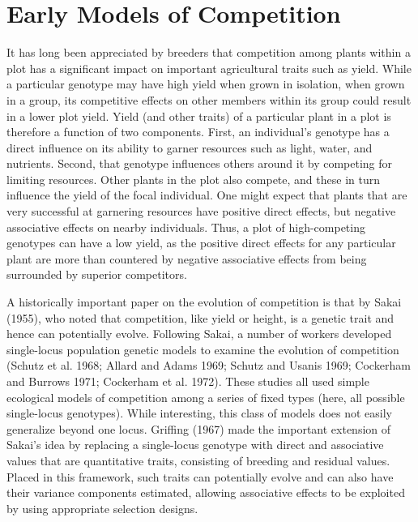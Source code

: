 \documentclass{article}
\begin{document}
\section{Early Models of Competition}
It has long been appreciated by breeders that competition among plants within a plot has a significant impact on important agricultural traits such as yield. While a particular genotype may have high yield when grown in isolation, when grown in a group, its competitive effects on other members within its group could result in a lower plot yield. Yield (and other traits) of a particular plant in a plot is therefore a function of two components. First, an individual's genotype has a direct influence on its ability to garner resources such as light, water, and nutrients. Second, that genotype influences others around it by competing for limiting resources. Other plants in the plot also compete, and these in turn influence the yield of the focal individual. One might expect that plants that are very successful at garnering resources have positive direct effects, but negative associative effects on nearby individuals. Thus, a plot of high-competing genotypes can have a low yield, as the positive direct effects for any particular plant are more than countered by negative associative effects from being surrounded by superior competitors.

A historically important paper on the evolution of competition is that by Sakai (1955), who noted that competition, like yield or height, is a genetic trait and hence can potentially evolve. Following Sakai, a number of workers developed single-locus population genetic models to examine the evolution of competition (Schutz et al. 1968; Allard and Adams 1969; Schutz and Usanis 1969; Cockerham and Burrows 1971; Cockerham et al. 1972). These studies all used simple ecological models of competition among a series of fixed types (here, all possible single-locus genotypes). While interesting, this class of models does not easily generalize beyond one locus. Griffing (1967) made the important extension of Sakai's idea by replacing a single-locus genotype with direct and associative values that are quantitative traits, consisting of breeding and residual values. Placed in this framework, such traits can potentially evolve and can also have their variance components estimated, allowing associative effects to be exploited by using appropriate selection designs.
\end{document}
